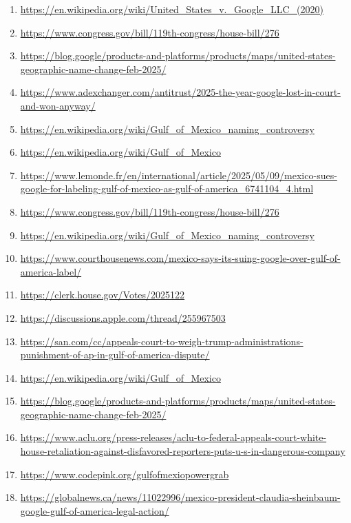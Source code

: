 \documentclass[10pt,a4paper]{article}
\begin{document}
\begin{enumerate}[leftmargin=*]
            \item \url{ https://en.wikipedia.org/wiki/United\_States\_v.\_Google\_LLC\_(2020) }
            \item \url{ https://www.congress.gov/bill/119th-congress/house-bill/276 }
            \item \url{ https://blog.google/products-and-platforms/products/maps/united-states-geographic-name-change-feb-2025/ }
            \item \url{ https://www.adexchanger.com/antitrust/2025-the-year-google-lost-in-court-and-won-anyway/ }
            \item \url{ https://en.wikipedia.org/wiki/Gulf\_of\_Mexico\_naming\_controversy }
            \item \url{ https://en.wikipedia.org/wiki/Gulf\_of\_Mexico }
            \item \url{ https://www.lemonde.fr/en/international/article/2025/05/09/mexico-sues-google-for-labeling-gulf-of-mexico-as-gulf-of-america\_6741104\_4.html }
            \item \url{ https://www.congress.gov/bill/119th-congress/house-bill/276 }
            \item \url{ https://en.wikipedia.org/wiki/Gulf\_of\_Mexico\_naming\_controversy }
            \item \url{ https://www.courthousenews.com/mexico-says-its-suing-google-over-gulf-of-america-label/ }
            \item \url{ https://clerk.house.gov/Votes/2025122 }
            \item \url{ https://discussions.apple.com/thread/255967503 }
            \item \url{ https://san.com/cc/appeals-court-to-weigh-trump-administrations-punishment-of-ap-in-gulf-of-america-dispute/ }
            \item \url{ https://en.wikipedia.org/wiki/Gulf\_of\_Mexico }
            \item \url{ https://blog.google/products-and-platforms/products/maps/united-states-geographic-name-change-feb-2025/ }
            \item \url{ https://www.aclu.org/press-releases/aclu-to-federal-appeals-court-white-house-retaliation-against-disfavored-reporters-puts-u-s-in-dangerous-company }
            \item \url{ https://www.codepink.org/gulfofmexiopowergrab }
            \item \url{ https://globalnews.ca/news/11022996/mexico-president-claudia-sheinbaum-google-gulf-of-america-legal-action/ }

\end{enumerate}
\end{document}
